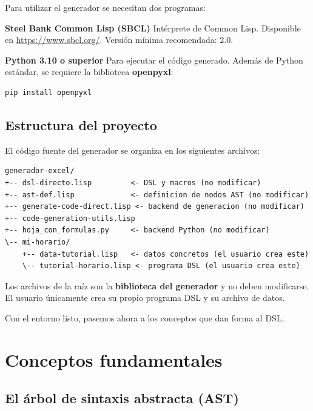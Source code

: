 \documentclass[12pt,a4paper]{report}
\begin{document}
Para utilizar el generador se necesitan dos programas:

\textbf{Steel Bank Common Lisp (SBCL)} \quad Intérprete de Common Lisp.
Disponible en \url{https://www.sbcl.org/}.
Versión mínima recomendada: 2.0.

\textbf{Python 3.10 o superior} \quad Para ejecutar el código generado.
Además de Python estándar, se requiere la biblioteca \textbf{openpyxl}:

\begin{lstlisting}[language=bash, numbers=none, backgroundcolor=\color{gray!10},
                   basicstyle=\ttfamily\small, keywordstyle={}]
pip install openpyxl
\end{lstlisting}

\subsection{Estructura del proyecto}

El código fuente del generador se organiza en los siguientes archivos:

\begin{lstlisting}[language={}, numbers=none, backgroundcolor=\color{gray!10},
                   basicstyle=\ttfamily\small]
generador-excel/
+-- dsl-directo.lisp         <- DSL y macros (no modificar)
+-- ast-def.lisp             <- definicion de nodos AST (no modificar)
+-- generate-code-direct.lisp <- backend de generacion (no modificar)
+-- code-generation-utils.lisp
+-- hoja_con_formulas.py     <- backend Python (no modificar)
\-- mi-horario/
    +-- data-tutorial.lisp   <- datos concretos (el usuario crea este)
    \-- tutorial-horario.lisp <- programa DSL (el usuario crea este)
\end{lstlisting}

Los archivos de la raíz son la \textbf{biblioteca del generador} y no
deben modificarse.  El usuario únicamente crea su propio programa DSL
y su archivo de datos.

Con el entorno listo, pasemos ahora a los conceptos que dan forma al DSL.

\section{Conceptos fundamentales}
\label{sec:conceptos}

\subsection{El árbol de sintaxis abstracta (AST)}
\end{document}
